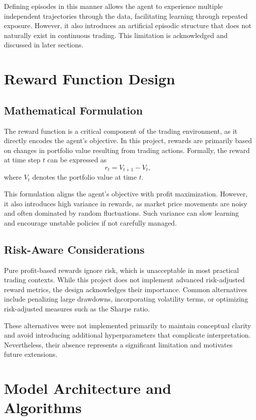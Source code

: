 \documentclass[12pt]{report}
\begin{document}
Defining episodes in this manner allows the agent to experience multiple independent trajectories through the data, facilitating learning through repeated exposure. However, it also introduces an artificial episodic structure that does not naturally exist in continuous trading. This limitation is acknowledged and discussed in later sections.

\chapter{Reward Function Design}

\section{Mathematical Formulation}

The reward function is a critical component of the trading environment, as it directly encodes the agent’s objective. In this project, rewards are primarily based on changes in portfolio value resulting from trading actions. Formally, the reward at time step $t$ can be expressed as
\[
r_t = V_{t+1} - V_t,
\]
where $V_t$ denotes the portfolio value at time $t$.

This formulation aligns the agent’s objective with profit maximization. However, it also introduces high variance in rewards, as market price movements are noisy and often dominated by random fluctuations. Such variance can slow learning and encourage unstable policies if not carefully managed.

\section{Risk-Aware Considerations}

Pure profit-based rewards ignore risk, which is unacceptable in most practical trading contexts. While this project does not implement advanced risk-adjusted reward metrics, the design acknowledges their importance. Common alternatives include penalizing large drawdowns, incorporating volatility terms, or optimizing risk-adjusted measures such as the Sharpe ratio.

These alternatives were not implemented primarily to maintain conceptual clarity and avoid introducing additional hyperparameters that complicate interpretation. Nevertheless, their absence represents a significant limitation and motivates future extensions.

\chapter{Model Architecture and Algorithms}
\end{document}
